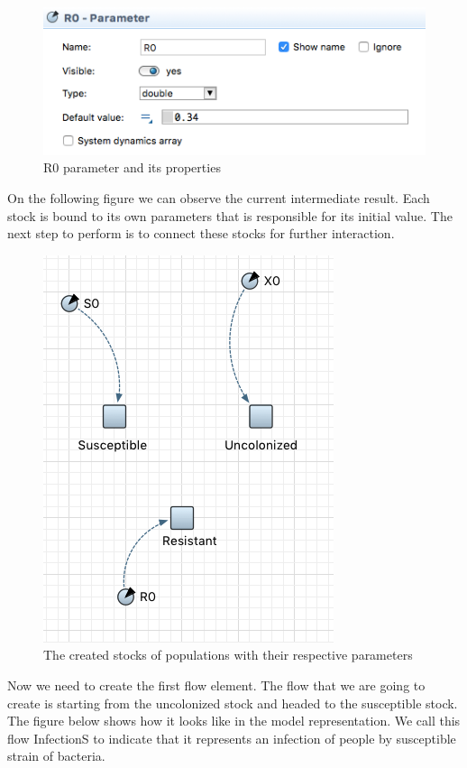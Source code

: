 \begin{figure}[H]
  \centering
  \includegraphics[height=0.3\textwidth]{img/screens/basic/basic5}
  \caption{R0 parameter and its properties}
\end{figure}

On the following figure we can observe the current intermediate result. Each stock is bound to its own parameters that is responsible for its initial value. The next step to perform is to connect these stocks for further interaction.

\begin{figure}[H]
  \centering
  \includegraphics[height=0.6\textwidth]{img/screens/basic/basic11}
  \caption{The created stocks of populations with their respective parameters}
\end{figure}

Now we need to create the first flow element. The flow that we are going to create is starting from the uncolonized stock and headed to the susceptible stock. The figure below shows how it looks like in the model representation. We call this flow InfectionS to indicate that it represents an infection of people by susceptible strain of bacteria.

